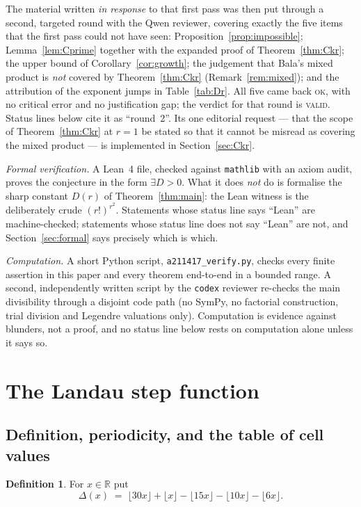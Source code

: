 \documentclass[11pt]{article}
\theoremstyle{plain}
\theoremstyle{definition}
\newtheorem{definition}[theorem]{Definition}
\theoremstyle{remark}
\numberwithin{equation}{section}
\newcommand{\R}{\mathbb{R}}
\begin{document}
The material written \emph{in response} to that first pass was then put through a second,
targeted round with the Qwen reviewer, covering exactly the five items that the first pass could
not have seen: Proposition~\ref{prop:impossible}; Lemma~\ref{lem:Cprime} together with the
expanded proof of Theorem~\ref{thm:Ckr}; the upper bound of Corollary~\ref{cor:growth}; the
judgement that Bala's mixed product is \emph{not} covered by Theorem~\ref{thm:Ckr}
(Remark~\ref{rem:mixed}); and the attribution of the exponent jumps in Table~\ref{tab:Dr}. All
five came back \textsc{ok}, with no critical error and no justification gap; the verdict for that
round is \textsc{valid}. Status lines below cite it as ``round~2''. Its one editorial request ---
that the scope of Theorem~\ref{thm:Ckr} at $r=1$ be stated so that it cannot be misread as
covering the mixed product --- is implemented in Section~\ref{sec:Ckr}.

\emph{Formal verification.} A Lean~4 file, checked against \texttt{mathlib} with an axiom audit,
proves the conjecture in the form $\exists D > 0$. What it does \emph{not} do is formalise the
sharp constant $D(r)$ of Theorem~\ref{thm:main}: the Lean witness is the deliberately crude
$(r!)^{r^2}$. Statements whose status line says ``Lean'' are machine-checked; statements whose
status line does not say ``Lean'' are not, and Section~\ref{sec:formal} says precisely which is
which.

\emph{Computation.} A short Python script, \texttt{a211417\_verify.py}, checks every finite
assertion in this paper and every theorem end-to-end in a bounded range. A second, independently
written script by the \texttt{codex} reviewer re-checks the main divisibility through a disjoint
code path (no SymPy, no factorial construction, trial division and Legendre valuations only).
Computation is evidence against blunders, not a proof, and no status line below rests on
computation alone unless it says so.

\section{The Landau step function}
\label{sec:step}

\subsection{Definition, periodicity, and the table of cell values}

\begin{definition}
For $x \in \R$ put
\[
  \Delta(x) \;=\; \lfloor 30x \rfloor + \lfloor x \rfloor - \lfloor 15x \rfloor
    - \lfloor 10x \rfloor - \lfloor 6x \rfloor .
\]
\end{definition}
\end{document}
